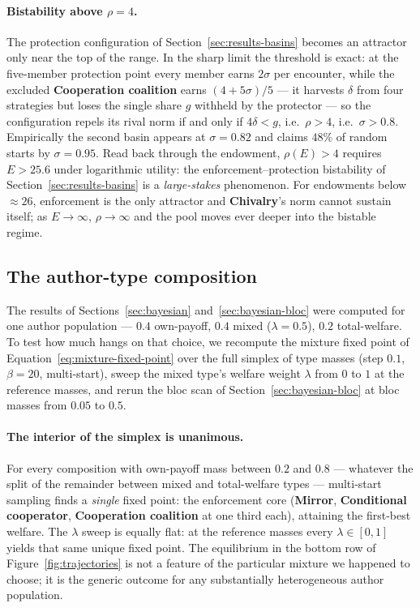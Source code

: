 \paragraph{Bistability above $\rho = 4$.}
The protection configuration of Section~\ref{sec:results-basins}
becomes an attractor only near the top of the range.
In the sharp limit the threshold is exact: at the five-member
protection point every member earns $2\sigma$ per encounter, while
the excluded \textbf{Cooperation coalition} earns
$(4 + 5\sigma)/5$ --- it harvests $\delta$ from four strategies but
loses the single share $g$ withheld by the protector --- so the
configuration repels its rival norm if and only if
$4\delta < g$, i.e.\ $\rho > 4$, i.e.\ $\sigma > 0.8$.
Empirically the second basin appears at $\sigma = 0.82$ and claims
$48\%$ of random starts by $\sigma = 0.95$.
Read back through the endowment, $\rho(E) > 4$ requires
$E > 25.6$ under logarithmic utility: the enforcement--protection
bistability of Section~\ref{sec:results-basins} is a
\emph{large-stakes} phenomenon.
For endowments below ${\approx}26$, enforcement is the only
attractor and \textbf{Chivalry}'s norm cannot sustain itself; as
$E \to \infty$, $\rho \to \infty$ and the pool moves ever deeper
into the bistable regime.

\subsection{The author-type composition}
\label{sec:sensitivity-types}

The results of Sections~\ref{sec:bayesian}
and~\ref{sec:bayesian-bloc} were computed for one author population
--- $0.4$ own-payoff, $0.4$ mixed ($\lambda = 0.5$), $0.2$
total-welfare.
To test how much hangs on that choice, we recompute the mixture
fixed point of Equation~\eqref{eq:mixture-fixed-point} over the full
simplex of type masses (step $0.1$, $\beta = 20$, multi-start),
sweep the mixed type's welfare weight $\lambda$ from $0$ to $1$ at
the reference masses, and rerun the bloc scan of
Section~\ref{sec:bayesian-bloc} at bloc masses from $0.05$ to
$0.5$.

\paragraph{The interior of the simplex is unanimous.}
For every composition with own-payoff mass between $0.2$ and $0.8$
--- whatever the split of the remainder between mixed and
total-welfare types --- multi-start sampling finds a \emph{single}
fixed point: the enforcement core
(\textbf{Mirror}, \textbf{Conditional cooperator},
\textbf{Cooperation coalition} at one third each), attaining the
first-best welfare.
The $\lambda$ sweep is equally flat: at the reference masses every
$\lambda \in [0, 1]$ yields that same unique fixed point.
The equilibrium in the bottom row of Figure~\ref{fig:trajectories}
is not a feature of the particular mixture we happened to choose;
it is the generic outcome for any substantially heterogeneous
author population.

